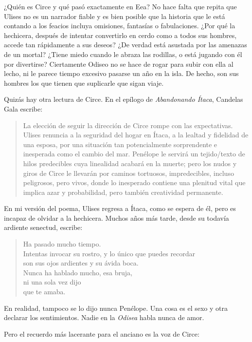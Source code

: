 \documentclass[11pt,a4paper]{article}
\begin{document}
¿Quién es Circe y qué pasó exactamente en Eea? No hace falta que repita que Ulises no es un narrador fiable y es bien posible que la historia que le está contando a los feacios incluya omisiones, fantasías o fabulaciones. ¿Por qué la hechicera, después de intentar convertirlo en cerdo como a todos sus hombres, accede tan rápidamente a sus deseos? ¿De verdad está asustada por las amenazas de un mortal? ¿Tiene miedo cuando le abraza las rodillas, o está jugando con él por divertirse? Ciertamente Odiseo no se hace de rogar para subir con ella al lecho, ni le parece tiempo excesivo pasarse un año en la isla. De hecho, son sus hombres los que tienen que suplicarle que sigan viaje.

Quizás hay otra lectura de Circe. En el epílogo de \emph{Abandonando Ítaca}, Candelas Gala escribe:

\begin{quotation}
La elección de seguir la dirección de Circe rompe con las expectativas. Ulises renuncia a la seguridad del hogar en Ítaca, a la lealtad y fidelidad de una esposa, por una situación tan potencialmente sorprendente e inesperada como el cambio del mar. Penélope le servirá un tejido/texto de hilos predecibles cuya linealidad acabará en la muerte; pero los nudos y giros de Circe le llevarán por caminos tortuosos, impredecibles, incluso peligrosos, pero vivos, donde lo inesperado contiene una plenitud vital que implica azar y probabilidad, pero también creatividad permanente.
\end{quotation}

En mi versión del poema, Ulises regresa a Ítaca, como se espera de él, pero es incapaz de olvidar a la hechicera. Muchos años más tarde, desde su todavía ardiente senectud, escribe:

\begin{verse}
Ha pasado mucho tiempo.\\
Intentas invocar su rostro, y lo único que puedes recordar\\
son sus ojos ardientes y su ávida boca.\\
Nunca ha hablado mucho, esa bruja,\\
ni una sola vez dijo\\
que te amaba.
\end{verse}

En realidad, tampoco se lo dijo nunca Penélope. Una cosa es el sexo y otra declarar los sentimientos. Nadie en la \emph{Odisea} habla nunca de amor.

Pero el recuerdo más lacerante para el anciano es la voz de Circe:
\end{document}
